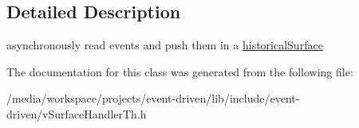 \subsection{Detailed Description}
asynchronously read events and push them in a \hyperlink{classev_1_1historicalSurface}{historical\+Surface} 

The documentation for this class was generated from the following file\+:\begin{DoxyCompactItemize}
\item 
/media/workspace/projects/event-\/driven/lib/include/event-\/driven/v\+Surface\+Handler\+Th.\+h\end{DoxyCompactItemize}
